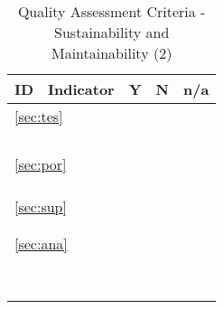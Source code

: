 \documentclass[a4paper,11pt]{article}
\begin{document}
\begin{table}[hbt]
	\begin{tabular}
		{ p{} | 
			p{} |
			p{} |
			p{} |
			p{} }
        \hline
        \textbf{ID} & \textbf{Indicator} & \textbf{Y} & \textbf{N} & \textbf{n/a} \\
        \hline 
        		\multicolumn{5}{l}{\ref{sec:tes}{ }\nameref{sec:tes}} \\
		\hline
		\hyperref[id:ts1]{\tsOneID} & \tsOneText & & & \\
		\hyperref[id:ts2]{\tsTwoID} & \tsTwoText & & & \\
		\hyperref[id:ts3]{\tsThreeID} & \tsThreeText & & & \\
		\hyperref[id:ts4]{\tsFourID} & \tsFourText & & & \\
		\hline
        \multicolumn{5}{l}{\ref{sec:por}{ }\nameref{sec:por}} \\
		\hline	
		\hyperref[id:pb1]{\pbOneID} & \pbOneText & & & \\
		\hyperref[id:pb2]{\pbTwoID} & \pbTwoText & & & \\
		\hyperref[id:pb3]{\pbThreeID} & \pbThreeText & & & \\
		\hline	
		\multicolumn{5}{l}{\ref{sec:sup}{ }\nameref{sec:sup}} \\
		\hline	
		\hyperref[id:sp1]{\spOneID} & \spOneText & & & \\
		\hyperref[id:sp2]{\spTwoID} & \spTwoText & & & \\
		\hline
		\multicolumn{5}{l}{\ref{sec:ana}{ }\nameref{sec:ana}} \\
		\hline	
		\hyperref[id:an1]{\anOneID} & \anOneText & & & \\
		\hyperref[id:an2]{\anTwoID} & \anTwoText & & & \\
		\hyperref[id:an3]{\anThreeID} & \anThreeText & & & \\
		\hyperref[id:an4]{\anFourID} & \anFourText & & & \\
		\hyperref[id:an5]{\anFiveID} & \anFiveText & & & \\
		\hyperref[id:an6]{\anSixID} & \anSixText & & & \\
		\hyperref[id:an7]{\anSevenID} & \anSevenText & & & \\
		\hyperref[id:an8]{\anEightID} & \anEightText & & & \\
		\hline
	\end{tabular}
	\caption{Quality Assessment Criteria - Sustainability and Maintainability (2)}
	\label{tab:criteriaSustMaint2}
\end{table}
\end{document}
